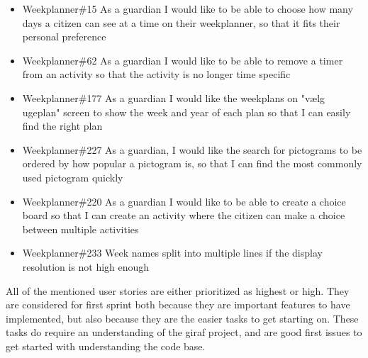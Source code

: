\begin{itemize}
    \item Weekplanner\#15 As a guardian I would like to be able to choose how many days a citizen can see at a time on their weekplanner, so that it fits their personal preference 
    \item Weekplanner\#62 As a guardian I would like to be able to remove a timer from an activity so that the activity is no longer time specific
    \item Weekplanner\#177 As a guardian I would like the weekplans on "vælg ugeplan" screen to show the week and year of each plan so that I can easily find the right plan 
    \item Weekplanner\#227 As a guardian, I would like the search for pictograms to be ordered by how popular a pictogram is, so that I can find the most commonly used pictogram quickly
    \item Weekplanner\#220 As a guardian I would like to be able to create a choice board so that I can create an activity where the citizen can make a choice between multiple activities 
    \item Weekplanner\#233 Week names split into multiple lines if the display resolution is not high enough 
\end{itemize}
\noindent
All of the mentioned user stories are either prioritized as highest or high. 
They are considered for first sprint both because they are important features to have implemented, but also because they are the easier tasks to get starting on.
These tasks do require an understanding of the giraf project, and are good first issues to get started with understanding the code base.
